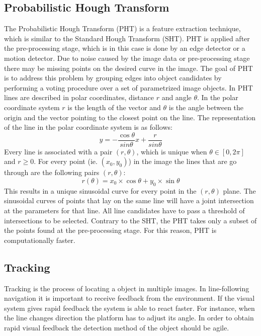\documentclass[a4paper]{article}
\begin{document}
\subsection{Probabilistic Hough Transform}
The Probabilistic Hough Transform (PHT) \cite{Kiryati1991} is a feature extraction technique, which is similar to the Standard Hough Transform (SHT). PHT is applied after the pre-processing stage, which is in this case is done by an edge detector or a motion detector. Due to noise caused by the image data or pre-processing stage there may be missing points on the desired curve in the image. The goal of PHT is to address this problem by grouping edges into object candidates by performing a voting procedure over a set of parametrized image objects. In PHT lines are described in polar coordinates, distance $r$ and angle $\theta$. In the polar coordinate system $r$ is the length of the vector and $\theta$ is the angle between the origin and the vector pointing to the closest point on the line. The representation of the line in the polar coordinate system is as follows:
\begin{equation}
y = -\frac{\cos \theta}{sin \theta} x + \frac{r}{sin \theta}
\end{equation}
Every line is associated with a pair $(r,\theta)$, which is unique when $\theta \in [0, 2\pi]$ and $r \geq 0$. For every point (ie. $(x_0, y_0)$) in the image the lines that are go through are the following pairs $(r, \theta)$:
\begin{equation}
r(\theta) = x_0 \times \cos \theta + y_0 \times \sin \theta
\end{equation}
This results in a unique sinusoidal curve for every point in the $(r, \theta)$ plane. The sinusoidal curves of points that lay on the same line will have a joint intersection at the parameters for that line. All line candidates have to pass a threshold of intersections to be selected. Contrary to the SHT, the PHT takes only a subset of the points found at the pre-processing stage. For this reason, PHT is computationally faster.

\subsection{Tracking}
Tracking is the process of locating a object in multiple images. In line-following navigation it is important to receive feedback from the environment. If the visual system gives rapid feedback the system is able to react faster. For instance, when the line changes direction the platform has to adjust its angle. In order to obtain rapid visual feedback the detection method of the object should be agile.
\end{document}
